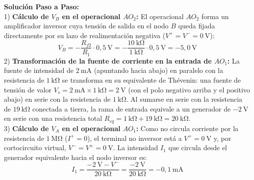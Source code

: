 \begin{ejercicio}
\begin{center}
\end{center}

\textbf{Solución Paso a Paso:}\\[4pt]
1) \textbf{Cálculo de $V_B$ en el operacional $AO_2$:}
El operacional $AO_2$ forma un amplificador inversor cuya tensión de salida en el nodo $B$ queda fijada directamente por su lazo de realimentación negativa ($V^+ = V^- = 0\ \si{\volt}$):
\begin{equation}
    \boxed{V_B = -\frac{R_{f2}}{R_1} \cdot 0{,}5\ \si{\volt} = -\frac{10\ \si{\kilo\ohm}}{1\ \si{\kilo\ohm}} \cdot 0{,}5\ \si{\volt} = -5{,}0\ \si{\volt}}
\end{equation}
2) \textbf{Transformación de la fuente de corriente en la entrada de $AO_1$:}
La fuente de intensidad de $2\ \si{\milli\ampere}$ (apuntando hacia abajo) en paralelo con la resistencia de $1\ \si{\kilo\ohm}$ se transforma en su equivalente de Thévenin: una fuente de tensión de valor $V_s = 2\ \si{\milli\ampere} \times 1\ \si{\kilo\ohm} = 2\ \si{\volt}$ (con el polo negativo arriba y el positivo abajo) en serie con la resistencia de $1\ \si{\kilo\ohm}$.
Al sumarse en serie con la resistencia de $19\ \si{\kilo\ohm}$ conectada a tierra, la rama de entrada equivale a un generador de $-2\ \si{\volt}$ en serie con una resistencia total $R_{eq} = 1\ \si{\kilo\ohm} + 19\ \si{\kilo\ohm} = 20\ \si{\kilo\ohm}$.\\[4pt]
3) \textbf{Cálculo de $V_A$ en el operacional $AO_1$:}
Como no circula corriente por la resistencia de $1\ \si{\mega\ohm}$ ($I^+ = 0$), el terminal no inversor está a $V^+ = 0\ \si{\volt}$ y, por cortocircuito virtual, $V^- = V^+ = 0\ \si{\volt}$.
La intensidad $I_1$ que circula desde el generador equivalente hacia el nodo inversor es:
\begin{equation}
    I_1 = \frac{-2\ \si{\volt} - V^-}{20\ \si{\kilo\ohm}} = \frac{-2\ \si{\volt}}{20\ \si{\kilo\ohm}} = -0{,}1\ \si{\milli\ampere}

\end{equation}
\end{ejercicio}
